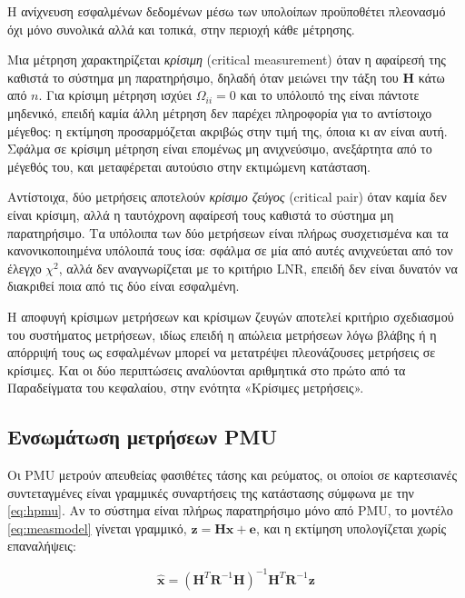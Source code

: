 Η ανίχνευση εσφαλμένων δεδομένων μέσω των υπολοίπων προϋποθέτει πλεονασμό όχι μόνο συνολικά
αλλά και τοπικά, στην περιοχή κάθε μέτρησης.

Μια μέτρηση χαρακτηρίζεται \emph{κρίσιμη} (critical measurement) όταν η αφαίρεσή της καθιστά το
σύστημα μη παρατηρήσιμο, δηλαδή όταν μειώνει την τάξη του $\mathbf{H}$ κάτω από $n$. Για
κρίσιμη μέτρηση ισχύει $\Omega_{ii} = 0$ και το υπόλοιπό της είναι πάντοτε μηδενικό, επειδή
καμία άλλη μέτρηση δεν παρέχει πληροφορία για το αντίστοιχο μέγεθος: η εκτίμηση προσαρμόζεται
ακριβώς στην τιμή της, όποια κι αν είναι αυτή. Σφάλμα σε κρίσιμη μέτρηση είναι επομένως μη
ανιχνεύσιμο, ανεξάρτητα από το μέγεθός του, και μεταφέρεται αυτούσιο στην εκτιμώμενη
κατάσταση.

Αντίστοιχα, δύο μετρήσεις αποτελούν \emph{κρίσιμο ζεύγος} (critical pair) όταν καμία δεν είναι
κρίσιμη, αλλά η ταυτόχρονη αφαίρεσή τους καθιστά το σύστημα μη παρατηρήσιμο. Τα υπόλοιπα των
δύο μετρήσεων είναι πλήρως συσχετισμένα και τα κανονικοποιημένα υπόλοιπά τους ίσα: σφάλμα σε
μία από αυτές ανιχνεύεται από τον έλεγχο $\chi^2$, αλλά δεν αναγνωρίζεται με το κριτήριο LNR,
επειδή δεν είναι δυνατόν να διακριθεί ποια από τις δύο είναι εσφαλμένη.

Η αποφυγή κρίσιμων μετρήσεων και κρίσιμων ζευγών αποτελεί κριτήριο σχεδιασμού του συστήματος
μετρήσεων, ιδίως επειδή η απώλεια μετρήσεων λόγω βλάβης ή η απόρριψή τους ως εσφαλμένων
μπορεί να μετατρέψει πλεονάζουσες μετρήσεις σε κρίσιμες. Και οι δύο περιπτώσεις αναλύονται αριθμητικά
στο πρώτο από τα Παραδείγματα του κεφαλαίου, στην ενότητα «Κρίσιμες μετρήσεις».

\subsection{Ενσωμάτωση μετρήσεων PMU}

Οι PMU μετρούν απευθείας φασιθέτες τάσης και ρεύματος, οι οποίοι σε καρτεσιανές συντεταγμένες
είναι γραμμικές συναρτήσεις της κατάστασης σύμφωνα με την \eqref{eq:hpmu}. Αν το σύστημα είναι
πλήρως παρατηρήσιμο μόνο από PMU, το μοντέλο \eqref{eq:measmodel} γίνεται γραμμικό,
$\mathbf{z} = \mathbf{H}\mathbf{x} + \mathbf{e}$, και η εκτίμηση υπολογίζεται χωρίς
επαναλήψεις:

\begin{equation}
\hat{\mathbf{x}} = \left(\mathbf{H}^{T}\mathbf{R}^{-1}\mathbf{H}\right)^{-1}
                    \mathbf{H}^{T}\mathbf{R}^{-1}\mathbf{z}
\label{eq:linse}
\end{equation}

